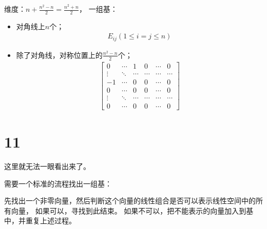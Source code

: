 \documentclass{article}
\begin{document}
维度：$n + \frac{n^2 - n}{2} = \frac{n^2 + n}{2}$，
一组基：
\begin{itemize}
  \item 对角线上$n$个；
        \begin{align*}
          E_{ij} (1 \leq i=j \leq n)
        \end{align*}

  \item 除了对角线，对称位置上的$\frac{n^2 - n}{2}$个；
        \begin{align*}
          \begin{bmatrix}
            0      & \cdots & 1      & 0      & \cdots & 0      \\
            \vdots & \ddots & \cdots & \cdots & \cdots & \cdots \\
            -1     & \cdots & 0      & 0      & \cdots & 0      \\
            0      & \cdots & 0      & 0      & \cdots & 0      \\
            \vdots & \ddots & \cdots & \cdots & \cdots & \cdots \\
            0      & \cdots & 0      & 0      & \cdots & 0
          \end{bmatrix}
        \end{align*}
\end{itemize}

\section*{11}

这里就无法一眼看出来了。

需要一个标准的流程找出一组基：

先找出一个非零向量，然后判断这个向量的线性组合是否可以表示线性空间中的所有向量，
如果可以，寻找到此结束。
如果不可以，把不能表示的向量加入到基中，并重复上述过程。
\end{document}
